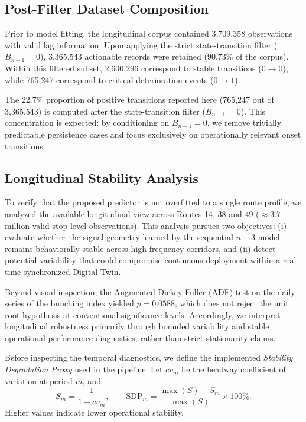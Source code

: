 \documentclass[fleqn,10pt,lineno]{wlpeerj}
\begin{document}
\subsection{Post-Filter Dataset Composition}
\label{sec:composicion}

Prior to model fitting, the longitudinal corpus contained 3,709,358 observations with valid lag information. Upon applying
the strict state-transition filter ($B_{n-1}=0$), 3,365,543 actionable records were retained (90.73\% of the corpus).
Within this filtered subset, 2,600,296 correspond to stable transitions ($0 \rightarrow 0$),
while 765,247 correspond to critical deterioration events ($0 \rightarrow 1$).

The 22.7\% proportion of positive transitions reported
here (765,247 out of 3,365,543) is computed after the state-transition filter
($B_{n-1}=0$). This concentration is expected: by conditioning on $B_{n-1}=0$, we remove trivially predictable persistence cases and focus exclusively on operationally relevant onset transitions.

\subsection{Longitudinal Stability Analysis}

To verify that the proposed predictor is not overfitted to a single route profile, we analyzed
the available longitudinal view across Routes 14, 38 and 49 ($\approx 3.7$ million valid stop-level observations). This analysis pursues two
objectives: (i) evaluate whether the signal geometry learned by the sequential $n{-}3$ model
remains behaviorally stable across high-frequency corridors, and (ii) detect potential variability
that could compromise continuous deployment within a real-time synchronized Digital Twin.

Beyond visual inspection, the Augmented Dickey-Fuller (ADF) test on the daily series of the
bunching index yielded $p=0.0588$, which does not reject the unit root hypothesis at conventional significance levels. Accordingly, we interpret longitudinal robustness primarily through bounded variability and stable operational performance diagnostics, rather than strict stationarity claims.

Before inspecting the temporal diagnostics, we define the implemented \textit{Stability Degradation Proxy} used in the pipeline. Let $cv_m$ be the headway coefficient of variation at period $m$, and
\begin{equation}
  S_m = \frac{1}{1 + cv_m}, \qquad
  \mathrm{SDP}_{m}=\frac{\max(S)-S_m}{\max(S)}\times 100\%.
\end{equation}
Higher values indicate lower operational stability.
\end{document}

